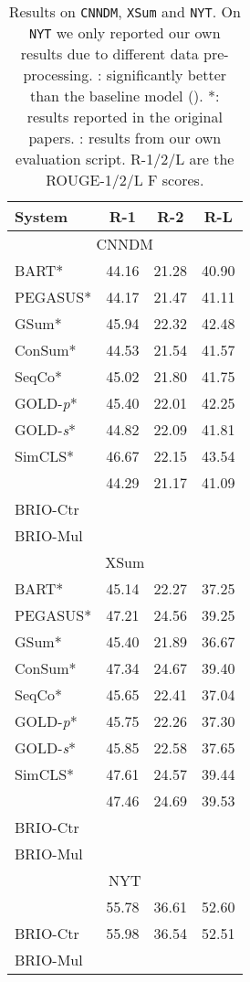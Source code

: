 \documentclass[11pt]{article}
\newcommand{\model}{BRIO\xspace}
\begin{document}
\begin{table}[t!]
\centering
\small
\begin{tabular}{lccc}
\toprule
\textbf{System} & \textbf{R-1} & \textbf{R-2} & \textbf{R-L}  \\
\midrule
\multicolumn{4}{c}{CNNDM} \\
\midrule
 BART* & 44.16 & 21.28 & 40.90 \\
 
 PEGASUS* & 44.17 & 21.47 & 41.11  \\
 GSum* & 45.94 & 22.32 & 42.48 \\
 ConSum* & 44.53 & 21.54 & 41.57 \\
 SeqCo* & 45.02 & 21.80 & 41.75 \\
 GOLD-\textit{p}* & 45.40 & 22.01 & 42.25 \\
 GOLD-\textit{s}* & 44.82 & 22.09 & 41.81 \\
 SimCLS* & 46.67 & 22.15 & 43.54 \\
  & 44.29 & 21.17 & 41.09 \\
\midrule
 \model-Ctr &  &  &  \\
 \model-Mul &  &  &  \\
\midrule
\multicolumn{4}{c}{XSum} \\
\midrule
 BART* & 45.14 & 22.27 & 37.25 \\
 PEGASUS* & 47.21 & 24.56 & 39.25 \\
 GSum* & 45.40 & 21.89 & 36.67 \\
 ConSum* & 47.34 & 24.67 & 39.40 \\
 SeqCo* & 45.65 & 22.41 & 37.04 \\
 GOLD-\textit{p}* & 45.75 & 22.26 & 37.30 \\
 GOLD-\textit{s}* & 45.85 & 22.58 & 37.65 \\
 SimCLS* & 47.61 & 24.57 & 39.44 \\
  & 47.46 & 24.69 & 39.53 \\
\midrule
 \model-Ctr &  &  &  \\
 \model-Mul &  &  &  \\
\midrule
\multicolumn{4}{c}{NYT} \\
\midrule
   & 55.78 & 36.61 & 52.60 \\
\midrule
\model-Ctr & 55.98 & 36.54 & 52.51 \\
 \model-Mul &  &  &  \\
\bottomrule
\end{tabular}
\caption{\label{tab:other} Results on \texttt{CNNDM}, \texttt{XSum} and \texttt{NYT}.
On \texttt{NYT} we only reported our own results due to different data pre-processing.
\dag: significantly better than the baseline model ().
*: results reported in the original papers.
\ddag: results from our own evaluation script.
R-1/2/L are the ROUGE-1/2/L F scores.}
\end{table}
\end{document}
